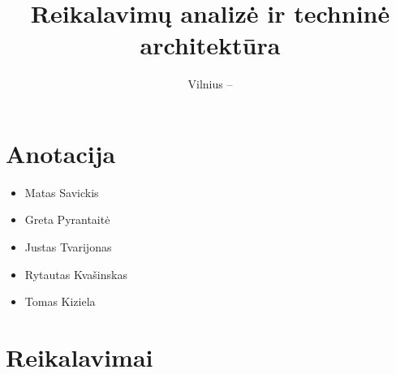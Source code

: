 \documentclass[oneside]{VUMIFPSkursinis}
\title{Reikalavimų analizė ir techninė architektūra}
\date{Vilnius – \the\year}
\begin{document}
\maketitle
\tableofcontents

\section{Anotacija}
	\begin{itemize}
		\item Matas Savickis
		\item Greta Pyrantaitė
		\item Justas Tvarijonas
		\item Rytautas Kvašinskas
		\item Tomas Kiziela
	\end{itemize}

\section {Reikalavimai}
\end{document}
